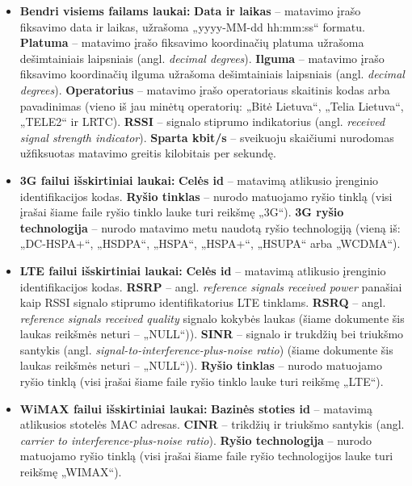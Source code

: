 \documentclass{VUMIFPSbakalaurinis}
\begin{document}
\begin{itemize}
	\item \textbf{Bendri visiems failams laukai:}
		\subitem \textbf{Data ir laikas} – matavimo įrašo fiksavimo data ir laikas, užrašoma „yyyy-MM-dd hh:mm:ss“ formatu.
		\subitem \textbf{Platuma} – matavimo įrašo fiksavimo koordinačių platuma užrašoma dešimtainiais laipsniais (angl. \textit{decimal degrees}).
		\subitem \textbf{Ilguma} – matavimo įrašo fiksavimo koordinačių ilguma užrašoma dešimtainiais laipsniais (angl. \textit{decimal degrees}).
		\subitem \textbf{Operatorius} – matavimo įrašo operatoriaus skaitinis kodas arba pavadinimas (vieno iš jau minėtų operatorių: „Bitė Lietuva“, „Telia Lietuva“, „TELE2“ ir LRTC).
		\subitem \textbf{RSSI} – signalo stiprumo indikatorius (angl. \textit{received signal strength indicator}).
		\subitem \textbf{Sparta kbit/s} – sveikuoju skaičiumi nurodomas užfiksuotas matavimo greitis kilobitais per sekundę.
	\item \textbf{3G failui išskirtiniai laukai:}
		\subitem \textbf{Celės id} – matavimą atlikusio įrenginio identifikacijos kodas.
		\subitem \textbf{Ryšio tinklas} – nurodo matuojamo ryšio tinklą (visi įrašai šiame faile ryšio tinklo lauke turi reikšmę „3G“).
		\subitem \textbf{3G ryšio technologija} – nurodo matavimo metu naudotą ryšio technologiją (vieną iš: „DC-HSPA+“, „HSDPA“, „HSPA“, „HSPA+“, „HSUPA“ arba „WCDMA“).
	\item \textbf{LTE failui išskirtiniai laukai:}
		\subitem \textbf{Celės id} – matavimą atlikusio įrenginio identifikacijos kodas.
		\subitem \textbf{RSRP} – angl. \textit{reference signals received power} panašiai kaip RSSI signalo stiprumo identifikatorius LTE tinklams.
		\subitem \textbf{RSRQ} – angl. \textit{reference signals received quality} signalo kokybės laukas (šiame dokumente šis laukas reikšmės neturi – „NULL“)).
		\subitem \textbf{SINR} – signalo ir trukdžių bei triukšmo santykis (angl. \textit{signal-to-interference-plus-noise ratio}) (šiame dokumente šis laukas reikšmės neturi – „NULL“)).
		\subitem \textbf{Ryšio tinklas} – nurodo matuojamo ryšio tinklą (visi įrašai šiame faile ryšio tinklo lauke turi reikšmę „LTE“).
	\item \textbf{WiMAX failui išskirtiniai laukai:}
		\subitem \textbf{Bazinės stoties id} – matavimą atlikusios stotelės MAC adresas.
		\subitem \textbf{CINR} – trikdžių ir triukšmo santykis (angl. \textit{carrier to interference-plus-noise ratio}).
		\subitem \textbf{Ryšio technologija} – nurodo matuojamo ryšio tinklą (visi įrašai šiame faile ryšio technologijos lauke turi reikšmę „WIMAX“).
\end{itemize}
\end{document}
